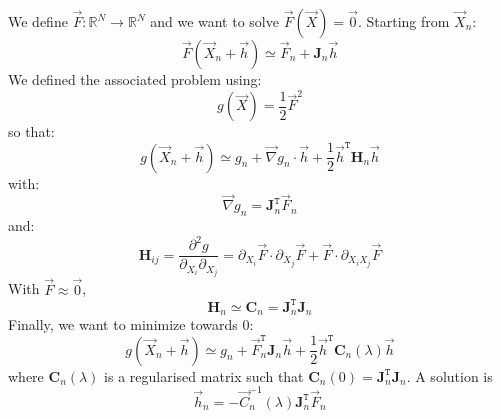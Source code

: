 \documentclass[aps,12pt]{revtex4}
\newcommand{\trn}[1]{{#1}^{\mathtt{T}}}
\begin{document}
We define $\vec{F} : \mathbb{R}^N \rightarrow \mathbb{R}^N$ and we want to solve $\vec{F}(\vec{X})=\vec{0}$.
Starting from $\vec{X}_n$:
\begin{equation}
	\vec{F}(\vec{X}_n + \vec{h}) \simeq \vec{F}_n + \bm{J}_n \vec{h}
\end{equation}
We defined the associated problem using:
\begin{equation}
	g(\vec{X}) = \frac{1}{2} \vec{F}^2 
\end{equation}
so that:
\begin{equation}
	g(\vec{X}_n+\vec{h}) \simeq g_n + \vec{\nabla}g_n \cdot \vec{h} + \frac{1}{2} \trn{\vec{h}} \bm{H}_n \vec{h}
\end{equation}
with:
\begin{equation}
	\vec{\nabla}g_n =  \trn{\bm{J}}_n \vec{F}_n
\end{equation}
and:
\begin{equation}
	\bm{H}_{ij} = \dfrac{\partial^2 g}{\partial_{X_i}\partial_{X_j}} = \partial_{X_i} \vec{F} \cdot \partial_{X_j} \vec{F} + \vec{F} \cdot \partial_{X_iX_j} \vec{F}
\end{equation}
With $\vec{F}\approx\vec0$,
\begin{equation}
	\bm{H}_n \simeq \bm{C}_n = \trn{\bm{J}}_n\bm{J}_n
\end{equation}
Finally, we want to minimize towards $0$:
\begin{equation}
	g(\vec{X}_n+\vec{h}) \simeq g_n + \trn{\vec{F}}_n \bm{J}_n \vec{h} + \frac{1}{2} \trn{\vec{h}} \bm{C}_n(\lambda) \vec{h}
\end{equation}
where $\bm{C}_n(\lambda)$ is a regularised matrix such that $\bm{C}_n(0)=\trn{\bm{J}}_n\bm{J}_n$.
A solution is
\begin{equation}
	\vec{h}_n = -\vec{C}_n^{-1}(\lambda) \trn{\bm{J}}_n \vec{F}_n
\end{equation}
\end{document}

